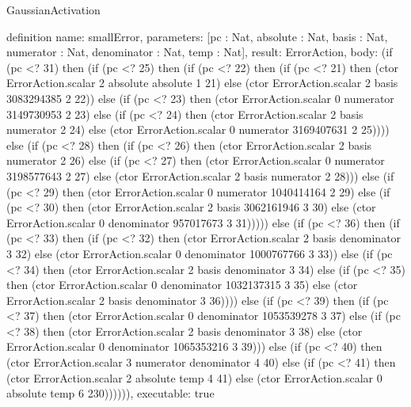 \begin{lexlean}{GaussianActivation}
\begin{semanticmodule}
definition{
  name: smallError,
  parameters: [pc : Nat, absolute : Nat, basis : Nat, numerator : Nat, denominator : Nat, temp : Nat],
  result: ErrorAction,
  body: (if (pc <? 31) then (if (pc <? 25) then (if (pc <? 22) then (if (pc <? 21) then (ctor ErrorAction.scalar 2 absolute absolute 1 21) else (ctor ErrorAction.scalar 2 basis 3083294385 2 22)) else (if (pc <? 23) then (ctor ErrorAction.scalar 0 numerator 3149730953 2 23) else (if (pc <? 24) then (ctor ErrorAction.scalar 2 basis numerator 2 24) else (ctor ErrorAction.scalar 0 numerator 3169407631 2 25)))) else (if (pc <? 28) then (if (pc <? 26) then (ctor ErrorAction.scalar 2 basis numerator 2 26) else (if (pc <? 27) then (ctor ErrorAction.scalar 0 numerator 3198577643 2 27) else (ctor ErrorAction.scalar 2 basis numerator 2 28))) else (if (pc <? 29) then (ctor ErrorAction.scalar 0 numerator 1040414164 2 29) else (if (pc <? 30) then (ctor ErrorAction.scalar 2 basis 3062161946 3 30) else (ctor ErrorAction.scalar 0 denominator 957017673 3 31))))) else (if (pc <? 36) then (if (pc <? 33) then (if (pc <? 32) then (ctor ErrorAction.scalar 2 basis denominator 3 32) else (ctor ErrorAction.scalar 0 denominator 1000767766 3 33)) else (if (pc <? 34) then (ctor ErrorAction.scalar 2 basis denominator 3 34) else (if (pc <? 35) then (ctor ErrorAction.scalar 0 denominator 1032137315 3 35) else (ctor ErrorAction.scalar 2 basis denominator 3 36)))) else (if (pc <? 39) then (if (pc <? 37) then (ctor ErrorAction.scalar 0 denominator 1053539278 3 37) else (if (pc <? 38) then (ctor ErrorAction.scalar 2 basis denominator 3 38) else (ctor ErrorAction.scalar 0 denominator 1065353216 3 39))) else (if (pc <? 40) then (ctor ErrorAction.scalar 3 numerator denominator 4 40) else (if (pc <? 41) then (ctor ErrorAction.scalar 2 absolute temp 4 41) else (ctor ErrorAction.scalar 0 absolute temp 6 230)))))),
  executable: true
}


\end{semanticmodule}
\end{lexlean}
